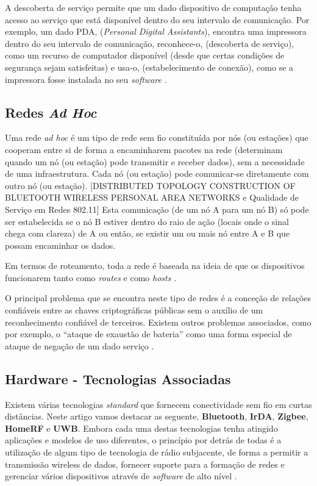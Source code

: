 \documentclass[conference]{IEEEtran}
\begin{document}
A descoberta de serviço permite que um dado dispositivo de computação tenha acesso ao serviço que está disponível dentro do seu intervalo de comunicação.
Por exemplo, um dado PDA, (\textit{Personal Digital Assistants}), encontra uma impressora dentro do seu intervalo de comunicação, reconhece-o, (descoberta de serviço), como um recurso de computador disponível (desde que certas condições de segurança sejam satisfeitas) e usa-o, (estabelecimento de conexão), como se a impressora fosse instalada no seu \textit{software} \cite{prasad2004ofdm}.

\subsection{Redes \textit{Ad Hoc}} \label{redes_ad_hoc}

Uma rede \textit{ad hoc} é um tipo de rede sem fio constituída por nós (ou estações) que cooperam entre si de forma a encaminharem pacotes na rede (determinam quando um nó (ou estação) pode transmitir e receber dados), sem a necessidade de uma infraestrutura. Cada nó (ou estação) pode comunicar-se diretamente com outro nó (ou estação). [DISTRIBUTED TOPOLOGY CONSTRUCTION OF BLUETOOTH WIRELESS PERSONAL AREA NETWORKS e Qualidade de Serviço em Redes 802.11] 
Esta comunicação (de um nó A para um nó B) só pode ser estabelecida se o nó B estiver dentro do raio de ação (locais onde o sinal chega com clareza) de A ou então, se existir um ou mais nó entre A e B que possam encaminhar os dados.

Em termos de roteamento, toda a rede é baseada na ideia de que os dispositivos funcionarem tanto como \textit{routes} e como \textit{hosts} \cite{prasad2004ofdm}.

O principal problema que se encontra neste tipo de redes é a conceção de relações confiáveis entre as chaves criptográficas públicas sem o auxílio de um reconhecimento confiável de terceiros. 
Existem outros problemas associados, como por exemplo, o “ataque de exaustão de bateria” como uma forma especial de ataque de negação de um dado serviço \cite{prasad2004ofdm}.



\subsection{Hardware - Tecnologias Associadas}

Existem várias tecnologias \textit{standard} que fornecem conectividade sem fio em curtas distâncias. Neste artigo vamos destacar as seguente, \textbf{Bluetooth}, \textbf{IrDA}, \textbf{Zigbee}, \textbf{HomeRF} e \textbf{UWB}.
Embora cada uma destas tecnologias tenha atingido aplicações e modelos de uso diferentes, o princípio por detrás de todas é a utilização de algum tipo de tecnologia de rádio subjacente, de forma a permitir a transmissão wireless de dados, fornecer suporte para a formação de redes e gerenciar vários dispositivos através de \textit{software} de alto nível \cite{prasad2004ofdm}.
\end{document}
